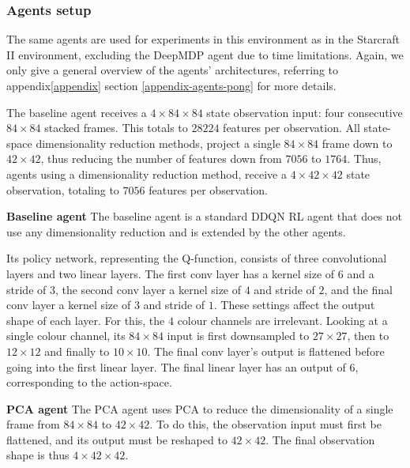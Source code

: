\subsubsection{Agents setup}
The same agents are used for experiments in this environment as in the Starcraft II environment, excluding the DeepMDP agent due to time limitations. Again, we only give a general overview of the agents' architectures, referring to appendix\ref{appendix} section \ref{appendix-agents-pong} for more details.

The baseline agent receives a $4 \times 84 \times 84$ state observation input: four consecutive $84 \times 84$ stacked frames. This totals to $28224$ features per observation. All state-space dimensionality reduction methods, project a single $84 \times 84$ frame down to $42 \times 42$, thus reducing the number of features down from $7056$ to $1764$. Thus, agents using a dimensionality reduction method, receive a $4 \times 42 \times 42$ state observation, totaling to $7056$ features per observation. \newline

\noindent \textbf{Baseline agent}\newline
\noindent The baseline agent is a standard DDQN RL agent that does not use any dimensionality reduction and is extended by the other agents.

Its policy network, representing the Q-function, consists of three convolutional layers and two linear layers. The first conv layer has a kernel size of $6$ and a stride of $3$, the second conv layer a kernel size of $4$ and stride of $2$, and the final conv layer a kernel size of $3$ and stride of $1$. These settings affect the output shape of each layer. For this, the $4$ colour channels are irrelevant. Looking at a single colour channel, its $84 \times 84$ input is first downsampled to $27 \times 27$, then to $12 \times 12$ and finally to $10 \times 10$. The final conv layer's output is flattened before going into the first linear layer. The final linear layer has an output of $6$, corresponding to the action-space.\newline

\noindent \textbf{PCA agent}\newline
\noindent The PCA agent uses PCA to reduce the dimensionality of a single frame from $84 \times 84$ to $42 \times 42$. To do this, the observation input must first be flattened, and its output must be reshaped to $42 \times 42$. The final observation shape is thus $4 \times 42 \times 42$.

